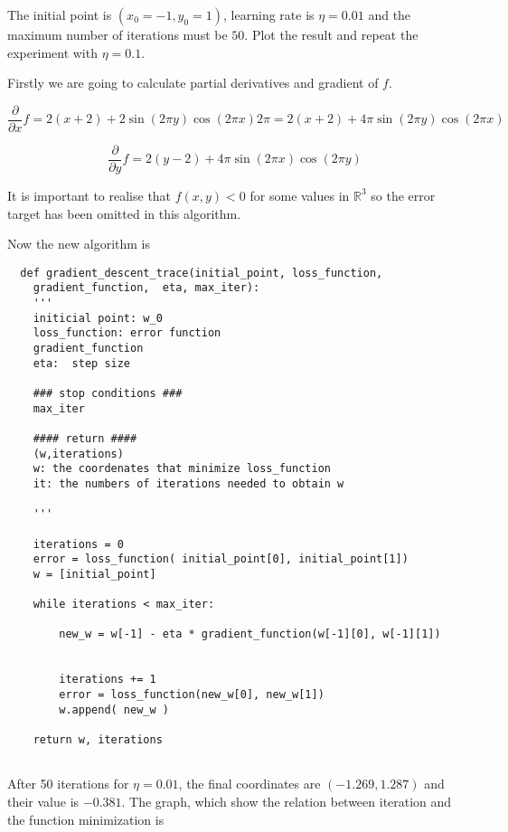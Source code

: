 The initial point is $(x_0 = -1, y_0 = 1)$,
learning rate is $\eta = 0.01$ and the maximum number of iterations must
be $50$.  Plot the result and repeat the experiment with  $\eta = 0.1$. 

Firstly we are going to calculate partial derivatives and gradient of $f$.

\begin{equation*}
  \frac{\partial }{\partial x} f = 2 (x + 2) + 2 \sin (2 \pi y) \cos ( 2 \pi x) 2 \pi =  2 (x + 2) +  4 \pi \sin (2 \pi y) \cos ( 2 \pi x)   
\end{equation*}

\begin{equation*}
  \frac{\partial }{\partial y} f = 2 (y - 2) +  4 \pi \sin (2 \pi x) \cos ( 2 \pi y)   
\end{equation*}


It is important to realise that $f(x,y) <0$ for some values in $\mathbb R^3$ so the error target has been omitted in this algorithm.   


Now the new algorithm is
\begin{verbatim}
  def gradient_descent_trace(initial_point, loss_function,
    gradient_function,  eta, max_iter):
    '''
    initicial point: w_0 
    loss_function: error function 
    gradient_function
    eta:  step size 

    ### stop conditions ###
    max_iter

    #### return ####
    (w,iterations)
    w: the coordenates that minimize loss_function
    it: the numbers of iterations needed to obtain w
    
    '''

    iterations = 0
    error = loss_function( initial_point[0], initial_point[1])
    w = [initial_point]
  
    while iterations < max_iter: 

        new_w = w[-1] - eta * gradient_function(w[-1][0], w[-1][1])
        
        
        iterations += 1
        error = loss_function(new_w[0], new_w[1])
        w.append( new_w ) 
    
    return w, iterations
  
  \end{verbatim}


  After 50 iterations for  $\eta = 0.01$, the  final coordinates are $(-1.269, 1.287)$ and their value is $-0.381$. The graph, which show the relation between iteration and the function minimization is

